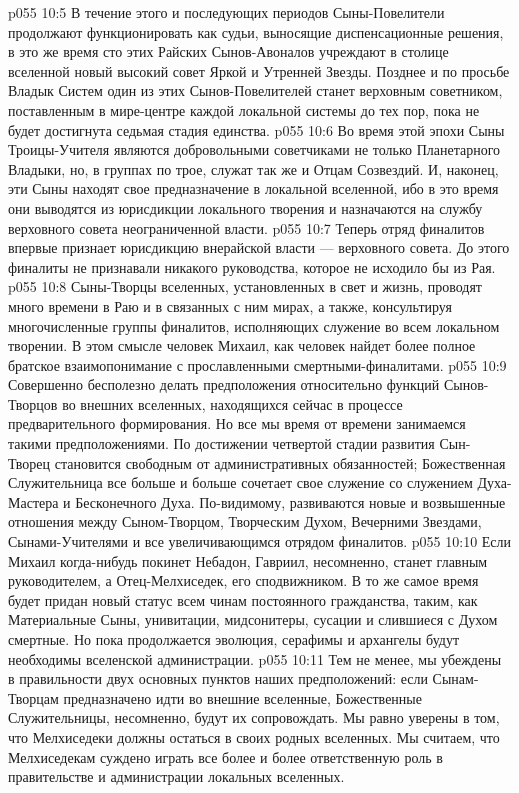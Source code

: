 \vs p055 10:5 В течение этого и последующих периодов Сыны\hyp{}Повелители продолжают функционировать как судьи, выносящие диспенсационные решения, в это же время сто этих Райских Сынов\hyp{}Авоналов учреждают в столице вселенной новый высокий совет Яркой и Утренней Звезды. Позднее и по просьбе Владык Систем один из этих Сынов\hyp{}Повелителей станет верховным советником, поставленным в мире\hyp{}центре каждой локальной системы до тех пор, пока не будет достигнута седьмая стадия единства.
\vs p055 10:6 Во время этой эпохи Сыны Троицы\hyp{}Учителя являются добровольными советчиками не только Планетарного Владыки, но, в группах по трое, служат так же и Отцам Созвездий. И, наконец, эти Сыны находят свое предназначение в локальной вселенной, ибо в это время они выводятся из юрисдикции локального творения и назначаются на службу верховного совета неограниченной власти.
\vs p055 10:7 \pc Теперь отряд финалитов впервые признает юрисдикцию внерайской власти --- верховного совета. До этого финалиты не признавали никакого руководства, которое не исходило бы из Рая.
\vs p055 10:8 Сыны\hyp{}Творцы вселенных, установленных в свет и жизнь, проводят много времени в Раю и в связанных с ним мирах, а также, консультируя многочисленные группы финалитов, исполняющих служение во всем локальном творении. В этом смысле человек Михаил, как человек найдет более полное братское взаимопонимание с прославленными смертными\hyp{}финалитами.
\vs p055 10:9 \pc Совершенно бесполезно делать предположения относительно функций Сынов\hyp{}Творцов во внешних вселенных, находящихся сейчас в процессе предварительного формирования. Но все мы время от времени занимаемся такими предположениями. По достижении четвертой стадии развития Сын\hyp{}Творец становится свободным от административных обязанностей; Божественная Служительница все больше и больше сочетает свое служение со служением Духа\hyp{}Мастера и Бесконечного Духа. По\hyp{}видимому, развиваются новые и возвышенные отношения между Сыном\hyp{}Творцом, Творческим Духом, Вечерними Звездами, Сынами\hyp{}Учителями и все увеличивающимся отрядом финалитов.
\vs p055 10:10 Если Михаил когда\hyp{}нибудь покинет Небадон, Гавриил, несомненно, станет главным руководителем, а Отец\hyp{}Мелхиседек, его сподвижником. В то же самое время будет придан новый статус всем чинам постоянного гражданства, таким, как Материальные Сыны, унивитации, мидсонитеры, сусации и слившиеся с Духом смертные. Но пока продолжается эволюция, серафимы и архангелы будут необходимы вселенской администрации.
\vs p055 10:11 Тем не менее, мы убеждены в правильности двух основных пунктов наших предположений: если Сынам\hyp{}Творцам предназначено идти во внешние вселенные, Божественные Служительницы, несомненно, будут их сопровождать. Мы равно уверены в том, что Мелхиседеки должны остаться в своих родных вселенных. Мы считаем, что Мелхиседекам суждено играть все более и более ответственную роль в правительстве и администрации локальных вселенных.
